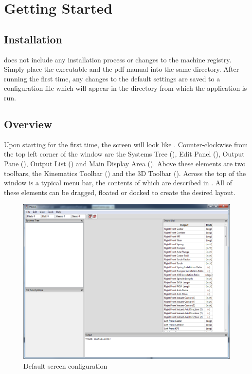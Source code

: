 \chapter{Getting Started} \label{ch:gettingStarted}

\section{Installation} \label{sec:installation}

\vvase{} does not include any installation process or changes to the machine registry.  Simply place the executable and the pdf manual into the same directory.  After running the first time, any changes to the default settings are saved to a configuration file which will appear in the directory from which the application is run.

\section{Overview} \label{sec:overview}

Upon starting \vvase{} for the first time, the screen will look like .  Counter-clockwise from the top left corner of the window are the Systems Tree (), Edit Panel (), Output Pane (), Output List () and Main Display Area ().  Above these elements are two toolbars, the Kinematics Toolbar () and the 3D Toolbar ().  Across the top of the window is a typical menu bar, the contents of which are described in .  All of these elements can be dragged, floated or docked to create the desired layout.

\begin{figure}
\includegraphics[width=\textwidth]{images/defaultStartup}
\caption{Default screen configuration} \label{fig:defaultStartup}
\centering
\end{figure}

